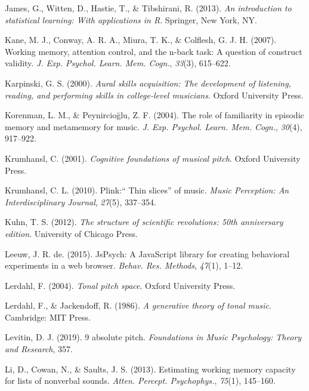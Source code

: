 \documentclass[english,man,floatsintext]{apa6}
\begin{document}
\leavevmode\hypertarget{ref-James2013-zf}{}%
James, G., Witten, D., Hastie, T., \& Tibshirani, R. (2013). \emph{An introduction to statistical learning: With applications in R}. Springer, New York, NY.

\leavevmode\hypertarget{ref-Kane2007-pt}{}%
Kane, M. J., Conway, A. R. A., Miura, T. K., \& Colflesh, G. J. H. (2007). Working memory, attention control, and the n-back task: A question of construct validity. \emph{J. Exp. Psychol. Learn. Mem. Cogn.}, \emph{33}(3), 615--622.

\leavevmode\hypertarget{ref-Karpinski2000-qz}{}%
Karpinski, G. S. (2000). \emph{Aural skills acquisition: The development of listening, reading, and performing skills in college-level musicians}. Oxford University Press.

\leavevmode\hypertarget{ref-Korenman2004-zu}{}%
Korenman, L. M., \& Peynircioğlu, Z. F. (2004). The role of familiarity in episodic memory and metamemory for music. \emph{J. Exp. Psychol. Learn. Mem. Cogn.}, \emph{30}(4), 917--922.

\leavevmode\hypertarget{ref-Krumhansl2001-nq}{}%
Krumhansl, C. (2001). \emph{Cognitive foundations of musical pitch}. Oxford University Press.

\leavevmode\hypertarget{ref-Krumhansl2010-ws}{}%
Krumhansl, C. L. (2010). Plink:`` Thin slices'' of music. \emph{Music Perception: An Interdisciplinary Journal}, \emph{27}(5), 337--354.

\leavevmode\hypertarget{ref-Kuhn2012-bx}{}%
Kuhn, T. S. (2012). \emph{The structure of scientific revolutions: 50th anniversary edition}. University of Chicago Press.

\leavevmode\hypertarget{ref-De_Leeuw2015-bl}{}%
Leeuw, J. R. de. (2015). JsPsych: A JavaScript library for creating behavioral experiments in a web browser. \emph{Behav. Res. Methods}, \emph{47}(1), 1--12.

\leavevmode\hypertarget{ref-Lerdahl2004-xc}{}%
Lerdahl, F. (2004). \emph{Tonal pitch space}. Oxford University Press.

\leavevmode\hypertarget{ref-Lerdahl1986-cn}{}%
Lerdahl, F., \& Jackendoff, R. (1986). \emph{A generative theory of tonal music}. Cambridge: MIT Press.

\leavevmode\hypertarget{ref-Levitin2019-sb}{}%
Levitin, D. J. (2019). 9 absolute pitch. \emph{Foundations in Music Psychology: Theory and Research}, 357.

\leavevmode\hypertarget{ref-Li2013-my}{}%
Li, D., Cowan, N., \& Saults, J. S. (2013). Estimating working memory capacity for lists of nonverbal sounds. \emph{Atten. Percept. Psychophys.}, \emph{75}(1), 145--160.
\end{document}
